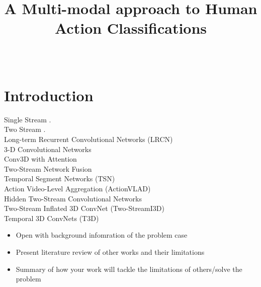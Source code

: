 \documentclass[conference]{IEEEtran}
\begin{document}
\title{A Multi-modal approach to Human Action Classifications}

\author{ \\
}
\maketitle

\begin{abstract}

\end{abstract}

\section{Introduction}
Single Stream \cite{KarpathyCVPR14}. \\
Two Stream \cite{SimonyanZ14}. \\ 
Long-term Recurrent Convolutional Networks (LRCN) \cite{DonahueHGRVSD14} \\
3-D Convolutional Networks \cite{TranBFTP14} \\ 
Conv3D with Attention \cite{YaoTCBPLC} \\
Two-Stream Network Fusion \cite{FeichtenhoferPZ16} \\
Temporal Segment Networks (TSN) \cite{WangXW0LTG16} \\
Action Video-Level Aggregation (ActionVLAD) \cite{GirdharRGSR17} \\ 
Hidden Two-Stream Convolutional Networks \cite{ZhuLNH17a} \\ 
Two-Stream Inflated 3D ConvNet (Two-StreamI3D) \cite{CarreiraZ17}\\
Temporal 3D ConvNets (T3D) \cite{AliMVAMRL} \\ 


\begin{itemize}
\item Open with background infomration of the problem case
\item Present literature review of other works and their limitations
\item Summary of how your work will tackle the limitations of others/solve the problem
\end{itemize}
\end{document}
